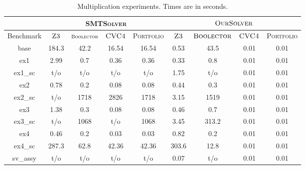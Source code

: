 \begin{table}[t]
\centering
\caption{Multiplication experiments. Times are in seconds.}
\label{my-label}
\begin{tabular}{|c|c|c|c|c|c|c|c|c|}
\hline
                      & \multicolumn{4}{c|}{\textsc{SMTSolver}}                    & \multicolumn{4}{c|}{$\textsc{OurSolver}$}                              \\ \hline
Benchmark             & {\scriptsize $\textsc{Z3}$} & ${\scriptsize \textsc{Boolector}}$ & {\scriptsize $\textsc{CVC4}$} & {\scriptsize \textsc{Portfolio}} & {\scriptsize $\textsc{Z3}$} & {\scriptsize $\textsc{Boolector}$} & {\scriptsize $\textsc{CVC4}$} & {\scriptsize \textsc{Portfolio}} \\ \hline
base                  & 184.3    & 42.2         & 16.54      & 16.54                & 0.53      & 43.5         & 0.01       & 0.01                 \\ \hline
ex1                   & 2.99      & 0.7          & 0.36       & 0.36                 & 0.33      & 0.8          & 0.01       & 0.01                 \\ \hline
ex1\_sc         & t/o       & t/o          & t/o        & t/o                  & 1.75      & t/o          & 0.01       & 0.01                 \\ \hline
ex2                   & 0.78      & 0.2          & 0.08       & 0.08                 & 0.44      & 0.3          & 0.01       & 0.01                 \\ \hline
ex2\_sc         & t/o       & 1718       & 2826    & 1718               & 3.15      & 1519       & 0.01       & 0.01                 \\ \hline
ex3                   & 1.38      & 0.3          & 0.08       & 0.08                 & 0.46      & 0.7          & 0.01       & 0.01                 \\ \hline
ex3\_sc         & t/o       & 1068       & t/o        & 1068               & 3.45      & 313.2        & 0.01       & 0.01                 \\ \hline
ex4         & 0.46      & 0.2          & 0.03       & 0.03                 & 0.82      & 0.2          & 0.01       & 0.01                 \\ \hline
ex4\_sc     & 287.3    & 62.8         & 42.36      & 42.36                & 303.6    & 12.8         & 0.01       & 0.01                 \\ \hline
sv\_assy              & t/o       & t/o          & t/o        & t/o                  & 0.07      & t/o          & 0.01       & 0.01                 \\ \hline

\end{tabular}
\end{table}
